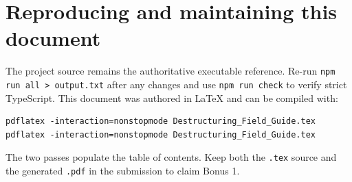\documentclass[11pt,a4paper]{article}
\begin{document}
\section{Reproducing and maintaining this document}
The project source remains the authoritative executable reference. Re-run \texttt{npm run all > output.txt} after any changes and use \texttt{npm run check} to verify strict TypeScript. This document was authored in LaTeX and can be compiled with:
\begin{lstlisting}
pdflatex -interaction=nonstopmode Destructuring_Field_Guide.tex
pdflatex -interaction=nonstopmode Destructuring_Field_Guide.tex
\end{lstlisting}
The two passes populate the table of contents. Keep both the \texttt{.tex} source and the generated \texttt{.pdf} in the submission to claim Bonus 1.
\end{document}
